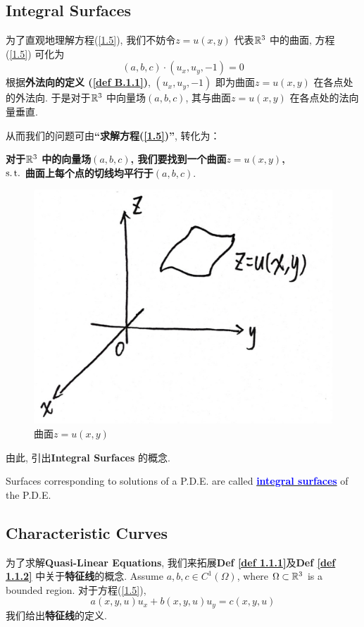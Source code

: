 \subsection{Integral Surfaces}
	为了直观地理解方程(\ref{1.5}), 我们不妨令$z = u(x , y)$ 代表$\mathbb{R}^3$ 中的曲面, 方程(\ref{1.5}) 可化为
	\[ (a , b , c) \cdot (u_x , u_y , -1) = 0 \]
	根据\textbf{外法向的定义 (\ref{def B.1.1})}, $(u_x , u_y , -1)$ 即为曲面$z = u(x , y)$ 在各点处的外法向. 于是对于$\mathbb{R}^3$ 中向量场$(a , b , c)$, 其与曲面$z = u(x , y)$ 在各点处的法向量垂直. 
	
	\vspace*{3em}
	
	\hspace*{-1.85em}从而我们的问题可由\textbf{“求解方程(\ref{1.5})”}, 转化为：
	\begin{center}
		\textbf{对于$\mathbb{R}^3$ 中的向量场$(a , b , c)$, 我们要找到一个曲面$z = u(x , y)$, \\
			$\operatorname{s.t.}$ 曲面上每个点的切线均平行于$(a , b , c)$}.
	\end{center}
	
	\vspace*{1em}
	
	\begin{figure}[thbp!]
		\centering
		\includegraphics[width=0.3\linewidth]{figure/1.2-1}
		\caption{曲面$z = u(x , y)$}
		\label{pic : 1.2-1} %
	\end{figure}
	
	\hspace*{-1.85em}由此, 引出\textbf{Integral Surfaces} 的概念. 
	
	\begin{defn}\label{def 1.2.1}
		Surfaces corresponding to solutions of a P.D.E. are called \underline{\textcolor{blue}{\textbf{integral surfaces}}} of the P.D.E.
	\end{defn}

\newpage

\subsection{Characteristic Curves}
	为了求解\textbf{Quasi-Linear Equations}, 我们来拓展\textbf{Def \ref{def 1.1.1}}及\textbf{Def \ref{def 1.1.2}} 中关于\textbf{特征线}的概念. Assume $a , b , c \in C^1(\Omega)$, where $\Omega \subset \mathbb{R}^3$ is a bounded region. 对于方程(\ref{1.5}), 
	\[ a(x , y , u) u_x + b(x , y , u)u_y = c(x , y , u) \]
	我们给出\textbf{特征线}的定义. 
	
